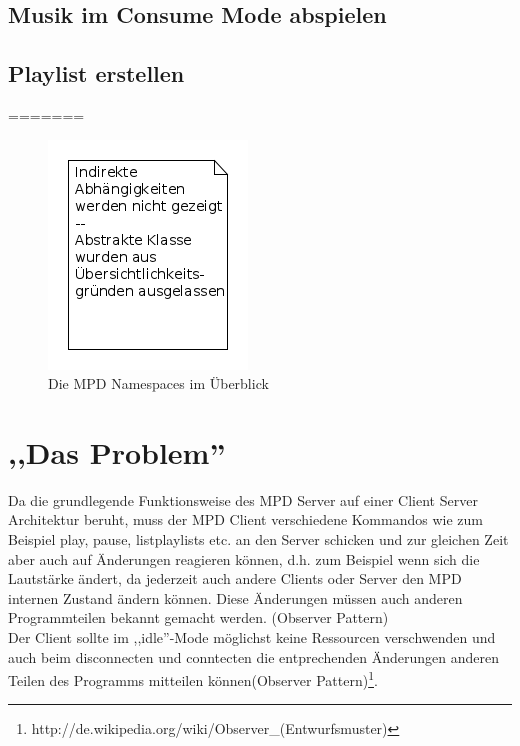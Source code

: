 \subsection{Musik im Consume Mode abspielen}
\subsection{Playlist erstellen}
=======

\begin{figure}[h!]
    \centering
    \includegraphics[scale=0.21]{Namespace_Uebersicht.png}
    \caption{Die MPD Namespaces im Überblick}
    \label{dd_namespaces}
\end{figure}

\section{,,Das Problem''}

Da die grundlegende Funktionsweise des MPD Server auf einer Client Server Architektur beruht, muss der MPD Client
verschiedene Kommandos wie zum Beispiel play, pause, listplaylists etc. an den Server schicken
und zur gleichen Zeit aber auch auf Änderungen reagieren können, d.h. zum Beispiel wenn sich die Lautstärke ändert,
da jederzeit auch andere Clients oder Server den MPD internen Zustand ändern können.
Diese Änderungen müssen auch anderen Programmteilen bekannt gemacht werden. (Observer Pattern)
\\
Der Client sollte im ,,idle''-Mode möglichst keine Ressourcen verschwenden und auch beim 
disconnecten und conntecten die entprechenden Änderungen anderen Teilen des Programms mitteilen
können(Observer Pattern)\footnote{http://de.wikipedia.org/wiki/Observer\_(Entwurfsmuster)}. 
\\

